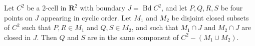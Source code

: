 Let $C^2$ be a 2-cell in $\mathbf{R}^2$ with boundary $J = \operatorname{Bd} C^2$, and let $P, Q, R, S$ be four points on $J$ appearing in cyclic order. Let $M_1$ and $M_2$ be disjoint closed subsets of $C^2$ such that $P, R \in M_1$ and $Q, S \in M_2$, and such that $M_1 \cap J$ and $M_2 \cap J$ are closed in $J$. Then $Q$ and $S$ are in the same component of $C^2 - (M_1 \cup M_2)$.
